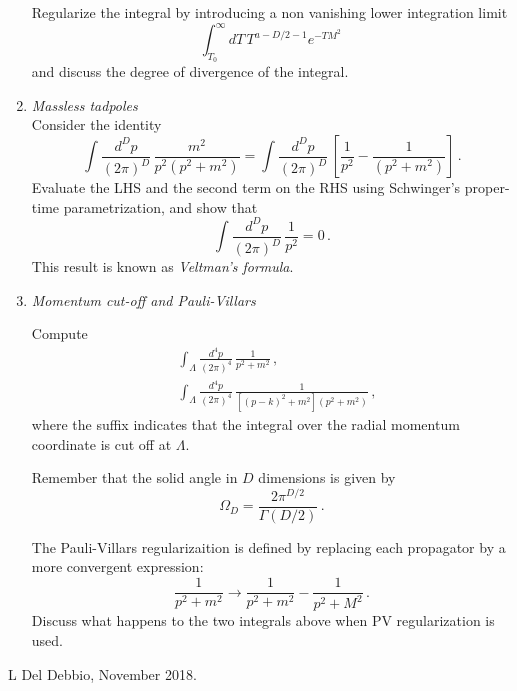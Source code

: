 \documentclass[12pt,a4paper]{article}
\begin{document}
\begin{enumerate}
  Regularize the integral by introducing a non vanishing lower
  integration limit
  \[
    \int_{T_0}^\infty dT\, T^{a-D/2-1} e^{-T M^2}\,
  \]
  and discuss the degree of divergence of the integral. 

\item {\it Massless tadpoles}\\

  Consider the identity
  \[
    \int \frac{d^Dp}{(2\pi)^D}\, \frac{m^2}{p^2(p^2+m^2)} =
    \int \frac{d^Dp}{(2\pi)^D}\, \left[
      \frac{1}{p^2} - \frac{1}{(p^2+m^2)}
    \right]\, .
  \]
  Evaluate the LHS and the second term on the RHS using Schwinger's
  proper-time parametrization, and show that
  \[
    \int \frac{d^Dp}{(2\pi)^D}\, \frac{1}{p^2} = 0\, .
  \]
  This result is known as {\em Veltman's formula}.

  \bigskip

  \item {\it Momentum cut-off and Pauli-Villars}

    Compute
    \begin{align*}
      &\int_\Lambda \frac{d^4p}{(2\pi)^4}\, \frac{1}{p^2+m^2}\, , \\
      &\int_\Lambda \frac{d^4p}{(2\pi)^4}\,
        \frac{1}{\left[(p-k)^2+m^2\right] \left(p^2+m^2\right)}\, ,
    \end{align*}
    where the suffix indicates that the integral over the radial
    momentum coordinate is cut off at $\Lambda$.

    Remember that the solid angle in $D$ dimensions is given by
    \[
      \Omega_D = \frac{2\pi^{D/2}}{\Gamma(D/2)}\, .
    \]
   
    The Pauli-Villars regularizaition is defined by replacing each
    propagator by a more convergent expression:
    \[
      \frac{1}{p^2+m^2} \longrightarrow
      \frac{1}{p^2+m^2} - \frac{1}{p^2+M^2} \, .
    \]
    Discuss what happens to the two integrals above when PV
    regularization is used. 
    
\end{enumerate}

\vfill
\hspace*{\fill}\tiny L Del Debbio, November 2018.
\end{document}
